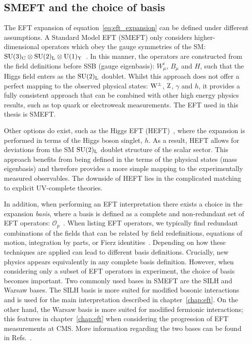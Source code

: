 \subsection{SMEFT and the choice of basis}
The EFT expansion of equation~\ref{eq:eft_expansion} can be defined under different assumptions. A Standard Model EFT (SMEFT) only considers higher-dimensional operators which obey the gauge symmetries of the SM: ${\rm{SU}}(3)_{\rm{C}} \otimes {\rm{SU}}(2)_{\rm{L}} \otimes {\rm{U}}(1)_{\rm{Y}}$~\cite{Brivio:2017vri}. In this manner, the operators are constructed from the field definitions before SSB (gauge eigenbasis): $W^i_\mu$, $B_\mu$ and $H$, such that the Higgs field enters as the ${\rm{SU}(2)_{\rm{L}}}$ doublet. Whilst this approach does not offer a perfect mapping to the observed physical states: ${\rm{W}}^{\pm}$, ${\rm{Z}}$, $\gamma$ and $h$, it provides a fully consistent approach that can be combined with other high energy physics results, such as top quark or electroweak measurements. The EFT used in this thesis is SMEFT. 

Other options do exist, such as the Higgs EFT (HEFT)~\cite{Brivio:2017vri,deFlorian:2016spz}, where the expansion is performed in terms of the Higgs boson singlet, $h$. As a result, HEFT allows for deviations from the SM ${\rm{SU}(2)_{\rm{L}}}$ doublet structure of the scalar sector. This approach benefits from being defined in the terms of the physical states (mass eigenbasis) and therefore provides a more simple mapping to the experimentally measured observables. The downside of HEFT lies in the complicated matching to explicit UV-complete theories.

In addition, when performing an EFT interpretation there exists a choice in the expansion \textit{basis}, where a basis is defined as a complete and non-redundant set of EFT operators: $\mathcal{O}_p$~\cite{deFlorian:2016spz}. When listing EFT operators, we typically find redundant combinations of the fields that can be related by field redefinitions, equations of motion, integration by parts, or Fierz identities~\cite{Ellis:2018gqa}. Depending on how these techniques are applied can lead to different basis definitions. Crucially, new physics appears equivalently in any complete basis definition. However, when considering only a subset of EFT operators in experiment, the choice of basis becomes important. Two commonly used bases in SMEFT are the SILH and Warsaw bases. The SILH basis is more suited for modified bosonic interactions and is used for the main interpretation described in chapter~\ref{chap:eft}. On the other hand, the Warsaw basis is more suited for modified fermionic interactions; this features in chapter~\ref{chap:eft} when considering the progression of EFT measurements at CMS. More information regarding the two bases can be found in Refs.~\cite{Giudice:2007fh,Contino:2013kra,Grzadkowski:2010es}.

